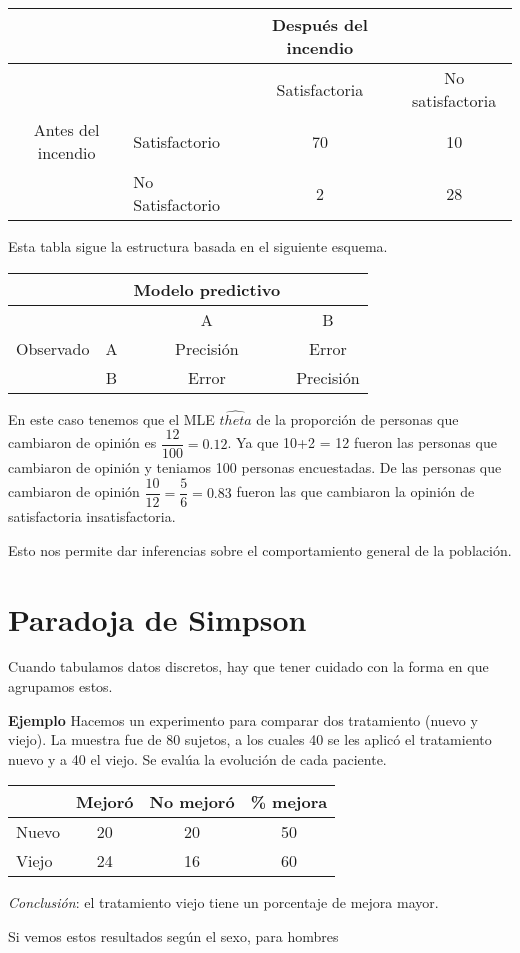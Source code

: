 \documentclass[
  12pt,
]{book}
\begin{document}
\begin{longtable}[]{@{}clcc@{}}
\toprule
& & Después del incendio &\tabularnewline
\midrule
\endhead
& & Satisfactoria & No satisfactoria\tabularnewline
\hline Antes del incendio & Satisfactorio & 70 & 10\tabularnewline
& No Satisfactorio & 2 & 28\tabularnewline
\bottomrule
\end{longtable}

Esta tabla sigue la estructura basada en el siguiente esquema.

\begin{longtable}[]{@{}cccc@{}}
\toprule
& & Modelo predictivo &\tabularnewline
\midrule
\endhead
& & A & B\tabularnewline
\hline Observado & A & Precisión & Error\tabularnewline
& B & Error & Precisión\tabularnewline
\bottomrule
\end{longtable}

En este caso tenemos que el MLE \(\hat{theta}\) de la proporción de personas que
cambiaron de opinión es \(\dfrac{12}{100} = 0.12\). Ya que 10+2 = 12 fueron las
personas que cambiaron de opinión y teniamos 100 personas encuestadas. De las
personas que cambiaron de opinión \(\dfrac{10}{12} = \dfrac{5}{6} = 0.83\) fueron
las que cambiaron la opinión de satisfactoria insatisfactoria.

Esto nos permite dar inferencias sobre el comportamiento general de la
población.

\hypertarget{paradoja-de-simpson}{%
\section{Paradoja de Simpson}\label{paradoja-de-simpson}}

Cuando tabulamos datos discretos, hay que tener cuidado con la forma en que
agrupamos estos.

\textbf{Ejemplo} Hacemos un experimento para comparar dos tratamiento (nuevo y
viejo). La muestra fue de 80 sujetos, a los cuales 40 se les aplicó el
tratamiento nuevo y a 40 el viejo. Se evalúa la evolución de cada paciente.

\begin{longtable}[]{@{}lccc@{}}
\toprule
& Mejoró & No mejoró & \% mejora\tabularnewline
\midrule
\endhead
Nuevo & 20 & 20 & 50\tabularnewline
Viejo & 24 & 16 & 60\tabularnewline
\bottomrule
\end{longtable}

\emph{Conclusión}: el tratamiento viejo tiene un porcentaje de mejora mayor.

Si vemos estos resultados según el sexo, para hombres
\end{document}
